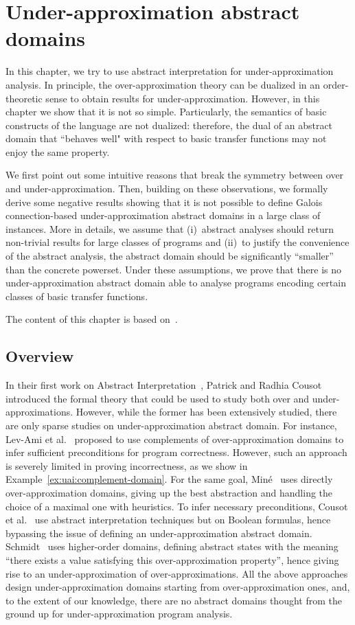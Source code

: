 
\chapter{Under-approximation abstract domains}\label{ch:uai}
In this chapter, we try to use abstract interpretation for under-approximation analysis. In principle, the over-approximation theory can be dualized in an order-theoretic sense to obtain results for under-approximation. However, in this chapter we show that it is not so simple. Particularly, the semantics of basic constructs of the language are not dualized: therefore, the dual of an abstract domain that ``behaves well" with respect to basic transfer functions may not enjoy the same property.

We first point out some intuitive reasons that break the symmetry between over and under-approximation. Then, building on these observations, we formally derive some negative results showing that it is not possible to define Galois connection-based under-approximation abstract domains in a large class of instances. More in details, we assume that (i)~abstract analyses should return non-trivial results for large classes of programs and (ii)~to justify the convenience of the abstract analysis, the abstract domain should be significantly “smaller” than the concrete powerset. Under these assumptions, we prove that there is no under-approximation abstract domain able to analyse programs encoding certain classes of basic transfer functions.

The content of this chapter is based on~\cite{ABG22,ABG24}.

\section{Overview}
In their first work on Abstract Interpretation~\cite{CC77}, Patrick and Radhia Cousot introduced the formal theory that could be used to study both over and under-approximations.
However, while the former has been extensively studied, there are only sparse studies on under-approximation abstract domain.
For instance, Lev-Ami et al.~\cite{LSRG07} proposed to use complements of over-approximation domains to infer sufficient preconditions for program correctness. However, such an approach is severely limited in proving incorrectness, as we show in Example~\ref{ex:uai:complement-domain}.
For the same goal, Miné~\cite{Mine14} uses directly over-approximation domains, giving up the best abstraction and handling the choice of a maximal one with heuristics.
To infer necessary preconditions, Cousot et al.~\cite{CCL11,CCFL13} use abstract interpretation techniques but on Boolean formulas, hence bypassing the issue of defining an under-approximation abstract domain.
Schmidt~\cite{Schmidt07} uses higher-order domains, defining abstract states with the meaning ``there exists a value satisfying this over-approximation property'', hence giving rise to an under-approximation of over-approximations.
All the above approaches design under-approximation domains starting from over-approximation ones, and, to the extent of our knowledge, there are no abstract domains thought from the ground up for under-approximation program analysis.

